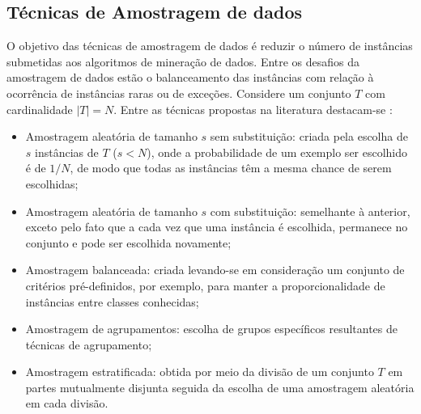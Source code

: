 \subsection{Técnicas de Amostragem de dados}
	\label{subsec:amostragem}
	
O objetivo das técnicas de amostragem de dados é reduzir o número de instâncias
submetidas aos algoritmos de mineração de dados. Entre os desafios da amostragem
de dados estão o balanceamento das instâncias com relação à ocorrência de
instâncias raras ou de exceções. Considere um conjunto $T$ com cardinalidade
$|T| = N$. Entre as técnicas propostas na literatura destacam-se
\cite{Garcia2015}:

\begin{itemize}
    \item Amostragem aleatória de tamanho $s$ sem substituição: criada pela
		escolha de $s$ instâncias de $T$ ($s < N$), onde a probabilidade de um
		exemplo ser escolhido é de $1/N$, de modo que todas as instâncias têm a
		mesma chance de serem escolhidas;
    
    \item Amostragem aleatória de tamanho $s$ com substituição: semelhante à
		anterior, exceto pelo fato que a cada vez que uma instância é escolhida,
		permanece no conjunto e pode ser escolhida novamente;
    
    \item Amostragem balanceada: criada levando-se em consideração um conjunto
		de critérios pré-definidos, por exemplo, para manter a proporcionalidade
		de instâncias entre classes conhecidas;
    
    \item Amostragem de agrupamentos: escolha de grupos específicos resultantes
		de técnicas de agrupamento;
    
    \item Amostragem estratificada: obtida por meio da divisão de um conjunto
		$T$ em partes mutualmente disjunta seguida da escolha de uma amostragem
		aleatória em cada divisão.
\end{itemize}

